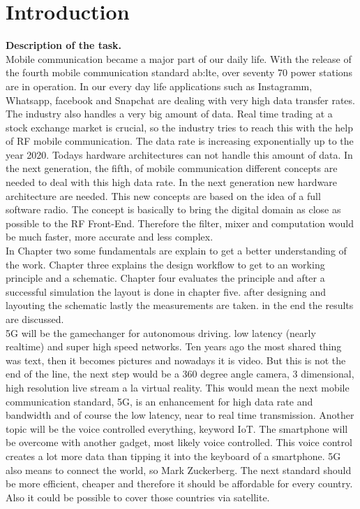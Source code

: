 \chapter{Introduction}
\textbf{Description of the task.}\\
Mobile communication became a major part of our daily life. With the release of the fourth mobile communication standard  \gls{ab:lte}, over seventy 70 power stations are in operation.
In our every day life applications such as Instagramm, Whatsapp, facebook  and Snapchat  are dealing with very high data transfer rates. The industry also handles a very big amount of data. 
Real time trading at a stock exchange market is crucial, so the industry tries to reach this with the help of RF mobile communication. 
The data rate is increasing exponentially up to the year 2020. 
Todays hardware architectures can not handle this amount of data. 
In the next generation, the fifth, of mobile communication different concepts are needed to deal with this high data rate. 
In the next generation new hardware architecture are needed. This new concepts are based on the idea of a full software radio. 
The concept is basically to bring the digital domain as close as possible to the RF Front-End. 
Therefore the filter, mixer and computation would be much faster, more accurate and less complex. \\
In Chapter two some fundamentals are explain to get a better understanding of the work. Chapter three explains the design workflow to get to an working principle and a schematic. Chapter four evaluates the principle and after a successful simulation the layout is done in chapter five. after designing and layouting the schematic lastly the measurements are taken. in the end the results are discussed.\\
5G will be the gamechanger for autonomous driving. low latency (nearly realtime) and super high speed networks. Ten years ago the most shared thing was text, then it becomes pictures and nowadays it is video. But this is not the end of the line, the next step would be a 360 degree angle camera, 3 dimensional, high resolution live stream a la virtual reality. This would mean the next mobile communication standard, 5G, is an enhancement for high data rate and bandwidth and of course the low latency, near to real time transmission. Another topic will be the voice controlled everything, keyword IoT. The smartphone will be overcome with another gadget, most likely voice controlled. This voice control creates a lot more data than tipping it into the keyboard of a smartphone. 5G also means to connect the world, so Mark Zuckerberg. The next standard should be more efficient, cheaper and therefore it should be affordable for every country. Also it could be possible to cover those countries via satellite.
